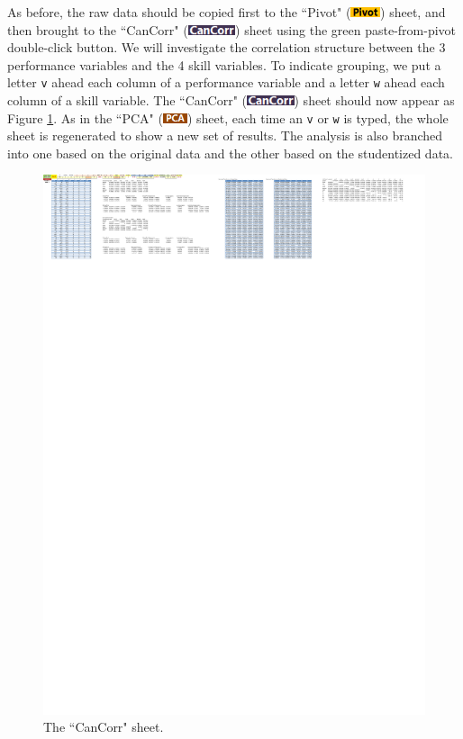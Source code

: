 \documentclass[article]{jss}
\numberwithin{equation}{subsection}
\newcommand{\shtPivot}{``Pivot" (\includegraphics[height=8pt, keepaspectratio=true]{img/PivotSheetTab_png}) }
\newcommand{\shtCanCorr}{``CanCorr" (\includegraphics[height=8pt, keepaspectratio=true]{img/CanCorrSheetTab_png}) }
\newcommand{\shtPCA}{``PCA" (\includegraphics[height=8pt, keepaspectratio=true]{img/PcaSheetTab_png}) }
\begin{document}
        As before, the raw data should be copied first to the \shtPivot sheet, and then brought to the \shtCanCorr sheet using the green paste-from-pivot double-click button. We will investigate the correlation structure between the 3 performance variables and the 4 skill variables. To indicate grouping, we put a letter \texttt{v} ahead each column of a performance variable and a letter \texttt{w} ahead each column of a skill variable. The \shtCanCorr sheet should now appear as Figure \ref{fig:The CanCorr sheet}. As in the \shtPCA sheet, each time an \texttt{v} or \texttt{w} is typed, the whole sheet is regenerated to show a new set of results. The analysis is also branched into one based on the original data and the other based on the studentized data.
        \begin{figure}[!tbh]
        	\includegraphics[width=\linewidth,keepaspectratio=true]{img/CanCorrSheetOutput}
        	\vspace{-20pt}\centering{}\protect\caption{The ``CanCorr" sheet.}\label{fig:The CanCorr sheet}
        \end{figure}
        
\end{document}
